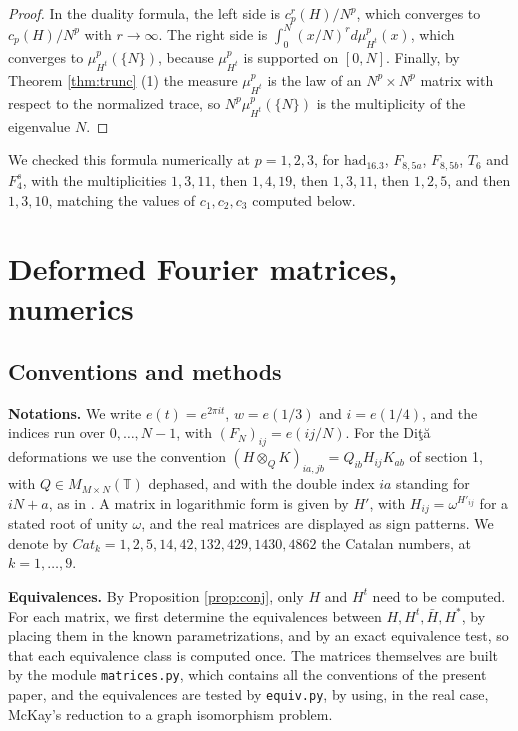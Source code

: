 \documentclass[11pt]{amsart}
\newcommand{\T}{\mathbb T}
\begin{document}
\begin{proof}
In the duality formula, the left side is $c_p^r(H)/N^p$, which converges to $c_p(H)/N^p$ with $r\to\infty$. The right side is $\int_0^N(x/N)^rd\mu^p_{H^t}(x)$, which converges to $\mu^p_{H^t}(\{N\})$, because $\mu^p_{H^t}$ is supported on $[0,N]$. Finally, by Theorem \ref{thm:trunc} (1) the measure $\mu^p_{H^t}$ is the law of an $N^p\times N^p$ matrix with respect to the normalized trace, so $N^p\mu^p_{H^t}(\{N\})$ is the multiplicity of the eigenvalue $N$.
\end{proof}

We checked this formula numerically at $p=1,2,3$, for $\mathrm{had}_{16.3}$, $F_{8,5a}$, $F_{8,5b}$, $T_6$ and $F_4^s$, with the multiplicities $1,3,11$, then $1,4,19$, then $1,3,11$, then $1,2,5$, and then $1,3,10$, matching the values of $c_1,c_2,c_3$ computed below.

\section{Deformed Fourier matrices, numerics}\label{sec:numerics}

\subsection{Conventions and methods}\label{sec:conv}

\noindent\textbf{Notations.} We write $e(t)=e^{2\pi it}$, $w=e(1/3)$ and $i=e(1/4)$, and the indices run over $0,\ldots,N-1$, with $(F_N)_{ij}=e(ij/N)$. For the Di\c t\u a deformations we use the convention $(H\otimes_QK)_{ia,jb}=Q_{ib}H_{ij}K_{ab}$ of section 1, with $Q\in M_{M\times N}(\T)$ dephased, and with the double index $ia$ standing for $iN+a$, as in \cite[Theorem 5.12]{banicaHM}. A matrix in logarithmic form is given by $H'$, with $H_{ij}=\omega^{H'_{ij}}$ for a stated root of unity $\omega$, and the real matrices are displayed as sign patterns. We denote by $Cat_k=1,2,5,14,42,132,429,1430,4862$ the Catalan numbers, at $k=1,\ldots,9$.

\medskip

\noindent\textbf{Equivalences.} By Proposition \ref{prop:conj}, only $H$ and $H^t$ need to be computed. For each matrix, we first determine the equivalences between $H,H^t,\bar{H},H^*$, by placing them in the known parametrizations, and by an exact equivalence test, so that each equivalence class is computed once. The matrices themselves are built by the module \texttt{matrices.py}, which contains all the conventions of the present paper, and the equivalences are tested by \texttt{equiv.py}, by using, in the real case, McKay's reduction to a graph isomorphism problem.
\end{document}
